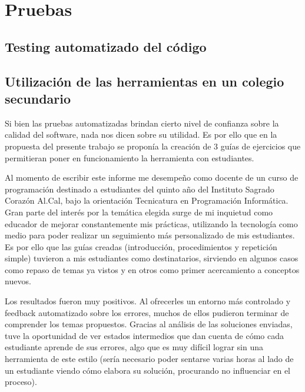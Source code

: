 
\section{Pruebas}
\subsection{Testing automatizado del código}

\subsection{Utilización de las herramientas en un colegio secundario}
Si bien las pruebas automatizadas brindan cierto nivel de confianza sobre la calidad del software, nada nos dicen sobre su utilidad. Es por ello que en la propuesta del presente trabajo se proponía la creación de 3 guías de ejercicios que permitieran poner en funcionamiento la herramienta con estudiantes.

Al momento de escribir este informe me desempeño como docente de un curso de programación destinado a estudiantes del quinto año del Instituto Sagrado Corazón Al.Cal, bajo la orientación Tecnicatura en Programación Informática. Gran parte del interés por la temática elegida surge de mi inquietud como educador de mejorar constantemente mis prácticas, utilizando la tecnología como medio para poder realizar un seguimiento más personalizado de mis estudiantes. Es por ello que las guías creadas (introducción, procedimientos y repetición simple) tuvieron a mis estudiantes como destinatarios, sirviendo en algunos casos como repaso de temas ya vistos y en otros como primer acercamiento a conceptos nuevos.

Los resultados fueron muy positivos. Al ofrecerles un entorno más controlado y feedback automatizado sobre los errores, muchos de ellos pudieron terminar de comprender los temas propuestos. Gracias al análisis de las soluciones enviadas, tuve la oportunidad de ver estados intermedios que dan cuenta de cómo cada estudiante aprende de sus errores, algo que es muy difícil lograr sin una herramienta de este estilo (sería necesario poder sentarse varias horas al lado de un estudiante viendo cómo elabora su solución, procurando no influenciar en el proceso).
